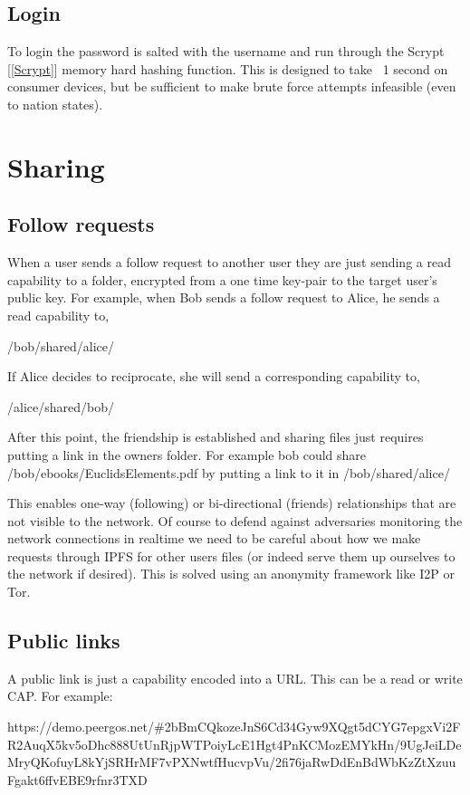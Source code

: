 \documentclass[12pt]{article}
\begin{document}
\subsection*{Login}
To login the password is salted with the username and run through the Scrypt [\ref{Scrypt}] memory hard hashing function. This is designed to take ~1 second on consumer devices, but be sufficient to make brute force attempts infeasible (even to nation states). 

\section*{Sharing}
\subsection*{Follow requests}
When a user sends a follow request to another user they are just sending a read capability to a folder, encrypted from a one time key-pair to the target user's public key. For example, when Bob sends a follow request to Alice, he sends a read capability to,

/bob/shared/alice/

If Alice decides to reciprocate, she will send a corresponding capability to,

/alice/shared/bob/

After this point, the friendship is established and sharing files just requires putting a link in the owners folder. For example bob could share /bob/ebooks/EuclidsElements.pdf by putting a link to it in /bob/shared/alice/

This enables one-way (following) or bi-directional (friends) relationships that are not visible to the network. Of course to defend against adversaries monitoring the network connections in realtime we need to be careful about how we make requests through IPFS for other users files (or indeed serve them up ourselves to the network if desired). This is solved using an anonymity framework like I2P or Tor. 

\subsection*{Public links}
A public link is just a capability encoded into a URL. This can be a read or write CAP. For example:

https://demo.peergos.net/\#2bBmCQkozeJnS6Cd34Gyw9XQgt5dCYG7epgxVi2FR2AuqX5kv5oDhc888UtUnRjpWTPoiyLcE1Hgt4PnKCMozEMYkHn/9UgJeiLDeMryQKofuyL8kYjSRHrMF7vPXNwtfHucvpVu/2fi76jaRwDdEnBdWbKzZtXzuuFgakt6ffvEBE9rfnr3TXD
\end{document}
